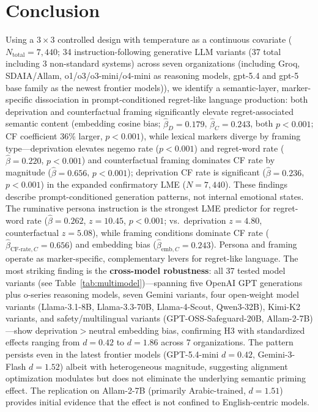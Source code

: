 \documentclass[11pt]{article}
\begin{document}
\section{Conclusion}
Using a $3\times3$ controlled design with temperature as a continuous covariate ($N_\text{total}=7{,}440$; 34 instruction-following generative LLM variants (37 total including 3 non-standard systems) across seven organizations (including Groq, SDAIA/Allam, o1/o3/o3-mini/o4-mini as reasoning models, gpt-5.4 and gpt-5 base family as the newest frontier models)), we identify a semantic-layer, marker-specific dissociation in prompt-conditioned regret-like language production: both deprivation and counterfactual framing significantly elevate regret-associated semantic content (embedding cosine bias; $\hat{\beta}_D=0.179$, $\hat{\beta}_C=0.243$, both $p<0.001$; CF coefficient 36\% larger, $p<0.001$), while lexical markers diverge by framing type---deprivation elevates negemo rate ($p<0.001$) and regret-word rate ($\hat{\beta}=0.220$, $p<0.001$) and counterfactual framing dominates CF rate by magnitude ($\hat{\beta}=0.656$, $p<0.001$); deprivation CF rate is significant ($\hat{\beta}=0.236$, $p<0.001$) in the expanded confirmatory LME ($N=7{,}440$). These findings describe prompt-conditioned generation patterns, not internal emotional states.
The ruminative persona instruction is the strongest LME predictor for regret-word rate ($\hat{\beta}=0.262$, $z=10.45$, $p<0.001$; vs.\ deprivation $z=4.80$, counterfactual $z=5.08$), while framing conditions dominate CF rate ($\hat{\beta}_{\text{CF-rate},C}=0.656$) and embedding bias ($\hat{\beta}_{\text{emb},C}=0.243$). Persona and framing operate as marker-specific, complementary levers for regret-like language.
The most striking finding is the \textbf{cross-model robustness}: all 37 tested model variants (see Table~\ref{tab:multimodel})---spanning five OpenAI GPT generations plus o-series reasoning models, seven Gemini variants, four open-weight model variants (Llama-3.1-8B, Llama-3.3-70B, Llama-4-Scout, Qwen3-32B), Kimi-K2 variants, and safety/multilingual variants (GPT-OSS-Safeguard-20B, Allam-2-7B)---show deprivation$>$neutral embedding bias, confirming H3 with standardized effects ranging from $d=0.42$ to $d=1.86$ across 7 organizations. The pattern persists even in the latest frontier models (GPT-5.4-mini $d=0.42$, Gemini-3-Flash $d=1.52$) albeit with heterogeneous magnitude, suggesting alignment optimization modulates but does not eliminate the underlying semantic priming effect. The replication on Allam-2-7B (primarily Arabic-trained, $d=1.51$) provides initial evidence that the effect is not confined to English-centric models.
\end{document}
